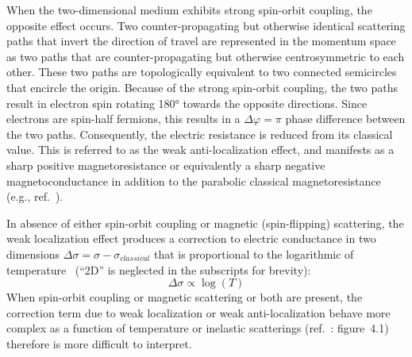 When the two-dimensional medium exhibits strong spin-orbit coupling, the opposite effect occurs. Two counter-propagating but otherwise identical scattering paths that invert the direction of travel are represented in the momentum space as two paths that are counter-propagating but otherwise centrosymmetric to each other. These two paths are topologically equivalent to two connected semicircles that encircle the origin. Because of the strong spin-orbit coupling, the two paths result in electron spin rotating \ang{180} towards the opposite directions. Since electrons are spin-half fermions, this results in a $\Delta\varphi=\pi$ phase difference between the two paths. Consequently, the electric resistance is reduced from its classical value. This is referred to as the weak anti-localization effect, and manifests as a sharp positive magnetoresistance or equivalently a sharp negative magnetoconductance in addition to the parabolic classical magnetoresistance (e.g., ref.~\cite{TI_WAL_Hongkong}).

In absence of either spin-orbit coupling or magnetic (spin-flipping) scattering, the weak localization effect produces a correction to electric conductance in two dimensions $\Delta\sigma = \sigma - \sigma_{classical}$ that is proportional to the logarithmic of temperature~\cite{anderson1979, dolan1979} (``2D'' is neglected in the subscripts for brevity):%
\begin{equation}\label{eq:wl_T}
    \Delta\sigma \propto \log(T)
\end{equation}%
When spin-orbit coupling or magnetic scattering or both are present, the correction term due to weak localization or weak anti-localization behave more complex as a function of temperature or inelastic scatterings (ref.~\cite{bergmann1984}: figure~4.1) therefore is more difficult to interpret.

